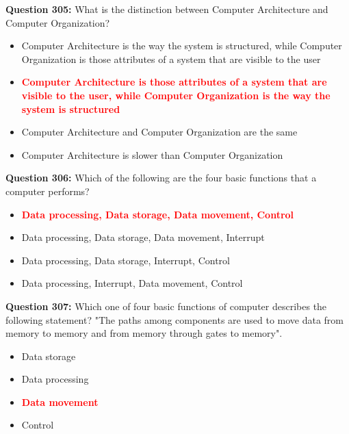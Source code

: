 \documentclass[12pt,a4paper]{article}
\begin{document}
\vspace{0.5cm}

\textbf{Question 305:} What is the distinction between Computer Architecture and Computer Organization?

\begin{itemize}
    \item[\textbf{A.}] Computer Architecture is the way the system is structured, while Computer Organization is those attributes of a system that are visible to the user
    \item[\textbf{B.}] \textcolor{red}{\textbf{Computer Architecture is those attributes of a system that are visible to the user, while Computer Organization is the way the system is structured}}
    \item[\textbf{C.}] Computer Architecture and Computer Organization are the same
    \item[\textbf{D.}] Computer Architecture is slower than Computer Organization
\end{itemize}

\vspace{0.5cm}

\textbf{Question 306:} Which of the following are the four basic functions that a computer performs?

\begin{itemize}
    \item[\textbf{A.}] \textcolor{red}{\textbf{Data processing, Data storage, Data movement, Control}}
    \item[\textbf{B.}] Data processing, Data storage, Data movement, Interrupt
    \item[\textbf{C.}] Data processing, Data storage, Interrupt, Control
    \item[\textbf{D.}] Data processing, Interrupt, Data movement, Control
\end{itemize}

\vspace{0.5cm}

\textbf{Question 307:} Which one of four basic functions of computer describes the following statement? "The paths among components are used to move data from memory to memory and from memory through gates to memory".

\begin{itemize}
    \item[\textbf{A.}] Data storage
    \item[\textbf{B.}] Data processing
    \item[\textbf{C.}] \textcolor{red}{\textbf{Data movement}}
    \item[\textbf{D.}] Control
\end{itemize}
\end{document}
